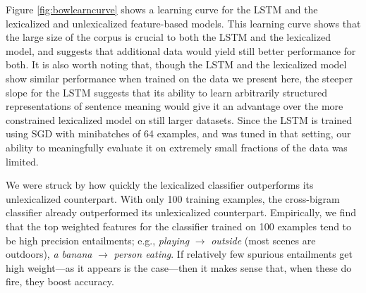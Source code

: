Figure \ref{fig:bowlearncurve} shows a learning curve for the LSTM and the lexicalized and unlexicalized feature-based models. This learning curve shows that the large size of the corpus is crucial to both the LSTM and the lexicalized model, and suggests that additional data would yield still better performance for both. It is also worth noting that, though the LSTM and the lexicalized model show similar performance when trained on the data we present here, the steeper slope for the LSTM suggests that its ability to learn arbitrarily structured representations of sentence meaning would give it an advantage over the more constrained lexicalized model on still larger datasets. Since the LSTM is trained using SGD with minibatches of 64 examples, and was tuned in that setting, our ability to meaningfully evaluate it on extremely small fractions of the data was limited.



We were struck by how quickly the lexicalized classifier outperforms its unlexicalized counterpart.
With only 100 training examples, the cross-bigram classifier already outperformed its unlexicalized counterpart.
Empirically, we find that the top weighted features for the classifier
  trained on 100 examples tend to be high precision entailments;
  e.g.,
  \textit{playing} $\rightarrow$ \textit{outside}
  (most scenes are outdoors), \textit{a banana} $\rightarrow$
  \textit{person eating}.
If relatively few spurious entailments get high weight---as it appears
is the case---then it makes sense that, when these do fire, they
boost accuracy.
  


